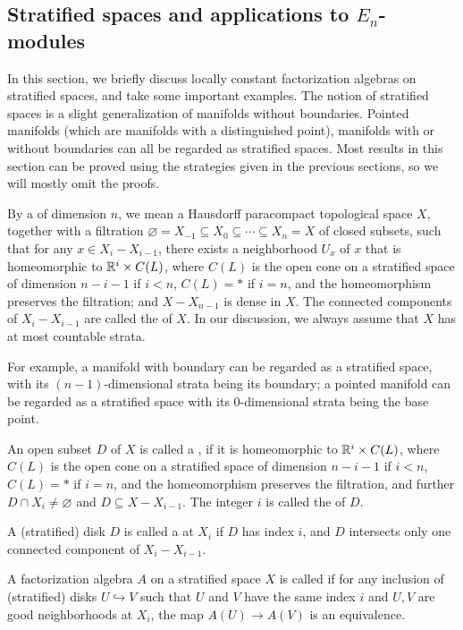 \documentclass[twoside]{article}
\begin{document}
\subsection{Stratified spaces and applications to \texorpdfstring{$E_n$}{En}-modules}

In this section, we briefly discuss locally constant factorization algebras on
stratified spaces, and take some important examples. The notion of
stratified spaces is a slight generalization of manifolds without boundaries.
Pointed manifolds (which are manifolds with a distinguished point),
manifolds with or without boundaries can all be regarded as
stratified spaces. Most results in this section can be proved
using the strategies given in the previous sections, so we will mostly omit
the proofs.

\begin{definition}
    By a  of dimension $n$, we mean a Hausdorff paracompact
    topological space $X$, together with a filtration $\varnothing=X_{-1}
    \subseteq X_0\subseteq\cdots\subseteq X_n=X$ of closed subsets, such that for
    any $x\in X_i-X_{i-1}$, there exists a neighborhood $U_x$ of $x$ that is
    homeomorphic to $\mathbb{R}^i\times C(L)$, where $C(L)$ is the open cone on a
    stratified space of dimension $n-i-1$ if $i<n$, $C(L)=*$ if $i=n$,
    and the homeomorphism preserves
    the filtration; and $X-X_{n-1}$ is dense in $X$. The connected components of
    $X_i-X_{i-1}$ are called the  of $X$. In our
    discussion, we always assume that $X$ has at most countable strata.
\end{definition}

For example, a manifold with boundary can be regarded as a stratified space,
with its $(n-1)$-dimensional strata being its boundary; a pointed manifold
can be regarded as a stratified space with its $0$-dimensional strata being the
base point.

\begin{definition}
    An open subset $D$ of $X$ is called a , if it is 
    homeomorphic to $\mathbb{R}^i\times C(L)$, where $C(L)$ is the open cone on a
    stratified space of dimension $n-i-1$ if $i<n$, $C(L)=*$ if $i=n$, 
    and the homeomorphism preserves
    the filtration, and further $D\cap X_i\ne\varnothing$ and 
    $D\subseteq X-X_{i-1}$. The integer $i$ is called the  of $D$.

    A (stratified) disk $D$ is called a  at $X_i$
    if $D$ has index $i$, and $D$ intersects only one connected component
    of $X_i-X_{i-1}$.

    A factorization algebra $A$ on a stratified space $X$ is called  if for any inclusion of (stratified) disks $U\hookrightarrow V$
    such that $U$ and $V$ have the same index $i$ and $U,V$ are good neighborhoods
    at $X_i$, the map $A(U)\to A(V)$ is an equivalence.
\end{definition}
\end{document}
